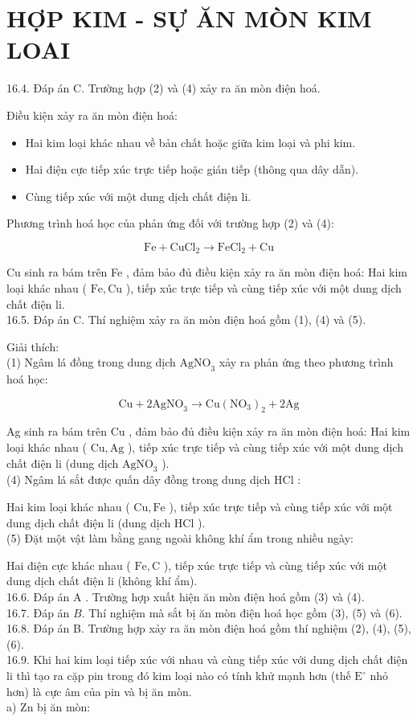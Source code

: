 \documentclass[10pt]{article}
\begin{document}
\section*{HỢP KIM - SỰ ĂN MÒN KIM LOAI}
16.4. Đáp án C. Trường hợp (2) và (4) xảy ra ăn mòn điện hoá.

Điều kiện xảy ra ăn mòn điện hoá:

\begin{itemize}
  \item Hai kim loại khác nhau về bản chất hoặc giữa kim loại và phi kim.
  \item Hai điện cực tiếp xúc trực tiếp hoặc gián tiếp (thông qua dây dẫn).
  \item Cùng tiếp xúc với một dung dịch chất điện li.
\end{itemize}

Phương trình hoá học của phản ứng đối với trường hợp (2) và (4):

$$
\mathrm{Fe}+\mathrm{CuCl}_{2} \rightarrow \mathrm{FeCl}_{2}+\mathrm{Cu}
$$

Cu sinh ra bám trên Fe , đảm bảo đủ điều kiện xảy ra ăn mòn điện hoá: Hai kim loại khác nhau ( $\mathrm{Fe}, \mathrm{Cu}$ ), tiếp xúc trực tiếp và cùng tiếp xúc với một dung dịch chất điện li.\\
16.5. Đáp án C. Thí nghiệm xảy ra ăn mòn điện hoá gồm (1), (4) và (5).

Giải thích:\\
(1) Ngâm lá đồng trong dung dịch $\mathrm{AgNO}_{3}$ xảy ra phản ứng theo phương trình hoá học:

$$
\mathrm{Cu}+2 \mathrm{AgNO}_{3} \rightarrow \mathrm{Cu}\left(\mathrm{NO}_{3}\right)_{2}+2 \mathrm{Ag}
$$

Ag sinh ra bám trên Cu , đảm bảo đủ điều kiện xảy ra ăn mòn điện hoá: Hai kim loại khác nhau ( $\mathrm{Cu}, \mathrm{Ag}$ ), tiếp xúc trực tiếp và cùng tiếp xúc với một dung dịch chất điện li (dung dịch $\mathrm{AgNO}_{3}$ ).\\
(4) Ngâm lá sắt được quấn dây đồng trong dung dịch HCl :

Hai kim loại khác nhau ( $\mathrm{Cu}, \mathrm{Fe}$ ), tiếp xúc trực tiếp và cùng tiếp xúc với một dung dịch chất điện li (dung dịch HCl ).\\
(5) Đặt một vật làm bằng gang ngoài không khí ẩm trong nhiều ngày:

Hai điện cực khác nhau ( $\mathrm{Fe}, \mathrm{C}$ ), tiếp xúc trực tiếp và cùng tiếp xúc với một dung dịch chất điện li (không khí ẩm).\\
16.6. Đáp án A . Trường hợp xuất hiện ăn mòn điện hoá gồm (3) và (4).\\
16.7. Đáp án $B$. Thí nghiệm mà sắt bị ăn mòn điện hoá học gồm (3), (5) và (6).\\
16.8. Đáp án B. Trường hợp xảy ra ăn mòn điện hoá gồm thí nghiệm (2), (4), (5), (6).\\
16.9. Khi hai kim loại tiếp xúc với nhau và cùng tiếp xúc với dung dịch chất điện li thì tạo ra cặp pin trong đó kim loại nào có tính khử mạnh hơn (thế $\mathrm{E}^{\circ}$ nhỏ hơn) là cực âm của pin và bị ăn mòn.\\
a) Zn bị ăn mòn:
\end{document}
